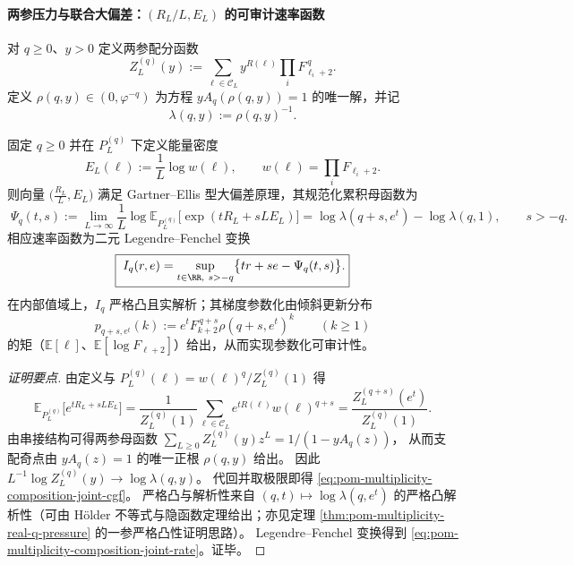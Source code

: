 \paragraph{两参压力与联合大偏差：\texorpdfstring{$(R_L/L,E_L)$}{(R\_L/L,E\_L)} 的可审计速率函数}
\begin{definition}\label{def:pom-multiplicity-composition-two-parameter-partition}
对 \(q\ge 0\)、\(y>0\) 定义两参配分函数
\[
Z_L^{(q)}(y):=\sum_{\boldsymbol{\ell}\in\mathcal{C}_L}y^{R(\boldsymbol{\ell})}\prod_i F_{\ell_i+2}^{\,q}.
\]
定义 \(\rho(q,y)\in(0,\varphi^{-q})\) 为方程
\(
yA_q(\rho(q,y))=1
\)
的唯一解，并记
\[
\boxed{\;\lambda(q,y):=\rho(q,y)^{-1}.\;}
\]
\end{definition}

\begin{theorem}\label{thm:pom-multiplicity-composition-joint-ldp-partcount-energy}
固定 \(q\ge 0\) 并在 \(P_L^{(q)}\) 下定义能量密度
\[
E_L(\boldsymbol{\ell}):=\frac{1}{L}\log w(\boldsymbol{\ell}),
\qquad
w(\boldsymbol{\ell})=\prod_i F_{\ell_i+2}.
\]
则向量 \(\bigl(\frac{R_L}{L},E_L\bigr)\) 满足 Gartner--Ellis 型大偏差原理，其规范化累积母函数为
\begin{equation}\label{eq:pom-multiplicity-composition-joint-cgf}
\boxed{\;
\Psi_q(t,s)
:=\lim_{L\to\infty}\frac{1}{L}\log \mathbb{E}_{P_L^{(q)}}\!\big[\exp(tR_L+sLE_L)\big]
=\log \lambda(q+s,e^{t})-\log\lambda(q,1),\qquad s>-q.}
\end{equation}
相应速率函数为二元 Legendre--Fenchel 变换
\begin{equation}\label{eq:pom-multiplicity-composition-joint-rate}
\boxed{\;
I_q(r,e)=\sup_{t\in\RR,\ s>-q}\bigl\{tr+se-\Psi_q(t,s)\bigr\}.}
\end{equation}
在内部值域上，\(I_q\) 严格凸且实解析；其梯度参数化由倾斜更新分布
\[
p_{q+s,e^t}(k):=e^{t}F_{k+2}^{\,q+s}\rho(q+s,e^t)^{k}\qquad(k\ge 1)
\]
的矩（\(\mathbb{E}[\ell]\)、\(\mathbb{E}[\log F_{\ell+2}]\)）给出，从而实现参数化可审计性。
\end{theorem}
\begin{proof}[证明要点]
由定义与 \(P_L^{(q)}(\boldsymbol{\ell})=w(\boldsymbol{\ell})^q/Z_L^{(q)}(1)\) 得
\[
\mathbb{E}_{P_L^{(q)}}\!\big[e^{tR_L+sLE_L}\big]
=\frac{1}{Z_L^{(q)}(1)}\sum_{\boldsymbol{\ell}\in\mathcal{C}_L}e^{tR(\boldsymbol{\ell})}w(\boldsymbol{\ell})^{q+s}
=\frac{Z_L^{(q+s)}(e^t)}{Z_L^{(q)}(1)}.
\]
由串接结构可得两参母函数
\(
\sum_{L\ge 0}Z_L^{(q)}(y)z^L=1/(1-yA_q(z))
\)，
从而支配奇点由 \(yA_q(z)=1\) 的唯一正根 \(\rho(q,y)\) 给出。
因此
\(
L^{-1}\log Z_L^{(q)}(y)\to \log\lambda(q,y)
\)。
代回并取极限即得 \eqref{eq:pom-multiplicity-composition-joint-cgf}。
严格凸与解析性来自 \((q,t)\mapsto\log\lambda(q,e^t)\) 的严格凸解析性（可由 H\"older 不等式与隐函数定理给出；亦见定理 \ref{thm:pom-multiplicity-real-q-pressure} 的一参严格凸性证明思路）。
Legendre--Fenchel 变换得到 \eqref{eq:pom-multiplicity-composition-joint-rate}。证毕。
\end{proof}

